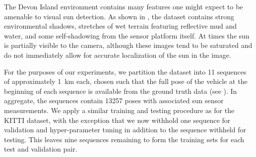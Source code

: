 The Devon Island environment contains many features one might expect to be amenable to visual sun detection.
As shown in , the dataset contains strong environmental shadows, stretches of wet terrain featuring reflective mud and water, and some self-shadowing from the sensor platform itself.
At times the sun is partially visible to the camera, although these images tend to be saturated and do not immediately allow for accurate localization of the sun in the image.

For the purposes of our experiments, we partition the dataset into 11 sequences of approximately 1~km each, chosen such that the full pose of the vehicle at the beginning of each sequence is available from the ground truth data (see ). In aggregate, the sequences contain 13257 poses with associated sun sensor measurements.
We apply a similar training and testing procedure as for the KITTI dataset, with the exception that we now withhold one sequence for validation and hyper-parameter tuning in addition to the sequence withheld for testing.
This leaves nine sequences remaining to form the training sets for each test and validation pair.

